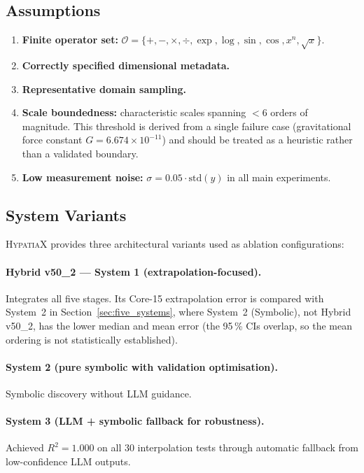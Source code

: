 \documentclass[twoside,11pt]{article}
\begin{document}
\subsection{Assumptions}\label{subsec:assumptions}
\label{sec:assumptions}

\begin{enumerate}
\item \textbf{Finite operator set:}
  $\mathcal{O} = \{+,-,\times,\div,\exp,\log,\sin,\cos,x^n,\sqrt{x}\}$.
\item \textbf{Correctly specified dimensional metadata.}
\item \textbf{Representative domain sampling.}
\item \textbf{Scale boundedness:} characteristic scales spanning
  $<6$ orders of magnitude.
  This threshold is derived from a single failure case (gravitational force
  constant $G = 6.674 \times 10^{-11}$) and should be treated as a heuristic
  rather than a validated boundary.
\item \textbf{Low measurement noise:}
  $\sigma = 0.05 \cdot \mathrm{std}(y)$ in all main experiments.
\end{enumerate}

\subsection{System Variants}\label{subsec:system-variants}
\label{sec:arch_variants}

\textsc{HypatiaX} provides three architectural variants used as ablation
configurations:

\paragraph{Hybrid v50\_2 --- System 1 (extrapolation-focused).}
Integrates all five stages. Its Core-15 extrapolation error is compared with System~2 in Section~\ref{sec:five_systems}, where System~2 (Symbolic), not Hybrid v50\_2, has the lower median and mean error (the 95\,\% CIs overlap, so the mean ordering is not statistically established).

\paragraph{System 2 (pure symbolic with validation optimisation).}
Symbolic discovery without LLM guidance.

\paragraph{System 3 (LLM + symbolic fallback for robustness).}
Achieved $R^2 = 1.000$ on all 30 interpolation tests through automatic
fallback from low-confidence LLM outputs.
\end{document}
